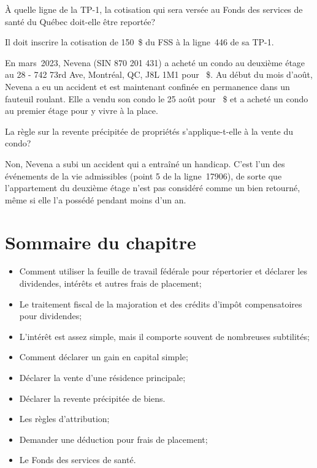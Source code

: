 \begin{sousQuestion}
	À quelle ligne de la TP-1, la cotisation qui sera versée au Fonds des services de santé du Québec doit-elle être reportée?
\end{sousQuestion}
Il doit inscrire la cotisation de 150~\$ du FSS à la ligne~446 de sa TP-1.

\begin{question}
	En mars~2023, Nevena (SIN 870 201 431) a acheté un condo au deuxième étage au 28 - 742 73rd Ave, Montréal, QC, J8L 1M1 pour ~\$. Au début du mois d'août, Nevena a eu un accident et est maintenant confinée en permanence dans un fauteuil roulant. Elle a vendu son condo le 25 août pour ~\$ et a acheté un condo au premier étage pour y vivre à la place.
	
	La règle sur la revente précipitée de propriétés s'applique-t-elle à la vente du condo? 
\end{question}
Non, Nevena a subi un accident qui a entraîné un handicap.  C'est l'un des événements de la vie admissibles (point 5 de la ligne~17906), de sorte que l'appartement du deuxième étage n'est pas considéré comme un bien retourné, même si elle l'a possédé pendant moins d'un an.  



\section{Sommaire du chapitre}
\begin{itemize}[label=]
	\item Comment utiliser la feuille de travail fédérale pour répertorier et déclarer les dividendes, intérêts et autres frais de placement;
	\item Le traitement fiscal de la majoration et des crédits d'impôt compensatoires pour dividendes;
	\item L'intérêt est assez simple, mais il comporte souvent de nombreuses subtilités; 
	\item Comment déclarer un gain en capital simple;
	\item Déclarer la vente d'une résidence principale;
	\item Déclarer la revente précipitée de biens.
	\item Les règles d'attribution;
	\item Demander une déduction pour frais de placement;
	\item Le Fonds des services de santé.
\end{itemize}




